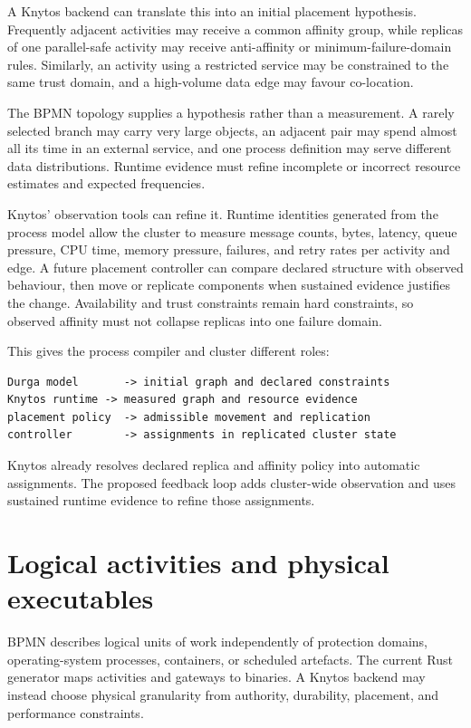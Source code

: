 A Knytos backend can translate this into an initial placement hypothesis.
Frequently adjacent activities may receive a common affinity group, while replicas of
one parallel-safe activity may receive anti-affinity or minimum-failure-domain
rules. Similarly, an activity using a restricted service may be constrained to the same
trust domain, and a high-volume data edge may favour co-location.

The BPMN topology supplies a hypothesis rather than a measurement. A rarely
selected branch may carry very large objects, an adjacent pair may spend almost
all its time in an external service, and one process definition may serve
different data distributions. Runtime evidence must refine incomplete or
incorrect resource estimates and expected frequencies.

Knytos' observation tools can refine it. Runtime identities generated
from the process model allow the cluster to measure message counts, bytes,
latency, queue pressure, CPU time, memory pressure, failures, and retry rates per
activity and edge. A future placement controller can compare declared structure
with observed behaviour, then move or replicate components when sustained
evidence justifies the change. Availability and trust constraints remain hard
constraints, so observed affinity must not collapse replicas into one failure
domain.

This gives the process compiler and cluster different roles:

\begin{verbatim}
Durga model       -> initial graph and declared constraints
Knytos runtime -> measured graph and resource evidence
placement policy  -> admissible movement and replication
controller        -> assignments in replicated cluster state
\end{verbatim}

Knytos already resolves declared replica and affinity policy into automatic
assignments. The proposed feedback loop adds cluster-wide observation and uses
sustained runtime evidence to refine those assignments.

\section{Logical activities and physical executables}

BPMN describes logical units of work independently of protection domains,
operating-system processes, containers, or scheduled artefacts. The current
Rust generator maps activities and gateways to binaries. A Knytos backend
may instead choose physical granularity from authority, durability, placement,
and performance constraints.

